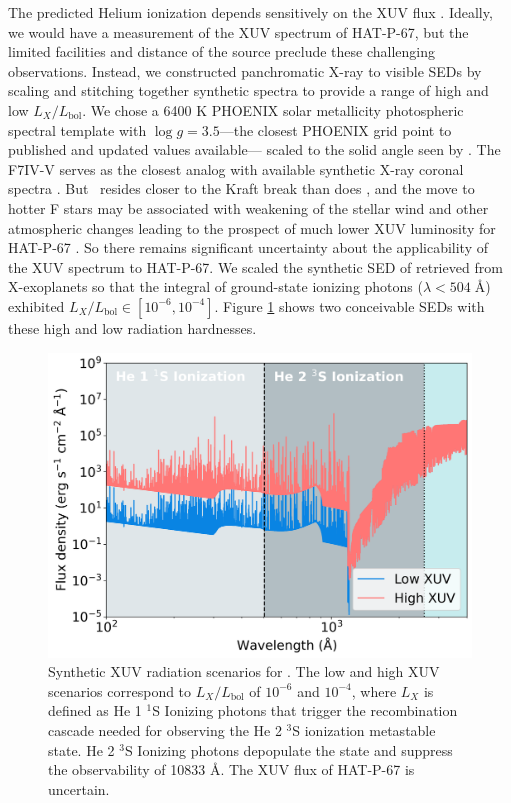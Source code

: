\documentclass[twocolumn]{aastex631}
\newcommand{\hatp}{\object{HAT-P-67}~}
\newcommand{\hatpb}{\object{HAT-P-67 b}}
\begin{document}
The predicted Helium ionization depends sensitively on the XUV flux \citep{2019ApJ...881..133O}.  Ideally, we would have a measurement of the XUV spectrum of HAT-P-67, but the limited facilities and distance of the source preclude these challenging observations.  Instead, we constructed panchromatic X-ray to visible SEDs by scaling and stitching together synthetic spectra to provide a range of high and low $L_X/L_\mathrm{bol}$.  We chose a 6400 K PHOENIX \citep{husser13} solar metallicity photospheric spectral template with $\log{g}=3.5$---the closest PHOENIX grid point to published and updated values available--- scaled to the solid angle seen by \hatpb.  The F7IV-V  serves as the closest analog with available synthetic X-ray coronal spectra \citep{2011A&A...532A...6S}.  But \hatp resides closer to the Kraft break than does , and the move to hotter F stars may be associated with weakening of the stellar wind and other atmospheric changes leading to the prospect of much lower XUV luminosity for HAT-P-67 \citep{2022ApJ...930....7A}.  So there remains significant uncertainty about the applicability of the  XUV spectrum to HAT-P-67.  We scaled the synthetic SED of  retrieved from X-exoplanets \citep{2011A&A...532A...6S} so that the integral of ground-state ionizing photons ($\lambda<504\;$\AA) exhibited $L_X/L_\mathrm{bol} \in [10^{-6}, 10^{-4}]$.  Figure \ref{fig:XUV} shows two conceivable SEDs with these high and low radiation hardnesses.

\begin{figure}
    \includegraphics[width=\linewidth]{figures/XUV_flux_schematic.png}
    \caption{Synthetic XUV radiation scenarios for \hatpb.  The low and high XUV scenarios correspond to $L_X/L_\mathrm{bol}$ of $10^{-6}$ and $10^{-4}$, where $L_X$ is defined as He 1 $^1$S Ionizing photons that trigger the recombination cascade needed for observing the He 2 $^3$S ionization metastable state.  He 2 $^3$S Ionizing photons depopulate the state and suppress the observability of  10833 \AA.  The XUV flux of HAT-P-67 is uncertain.}
    \label{fig:XUV}
\end{figure}
\end{document}

